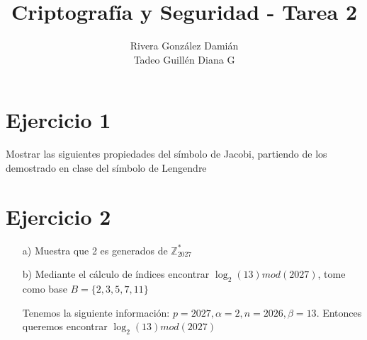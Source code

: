 \documentclass[12pt, letterpaper]{article}
\title{Criptografía y Seguridad - Tarea 2}
\author{Rivera González Damián\\Tadeo Guillén Diana G}
\begin{document}
\maketitle
\section*{Ejercicio 1}
Mostrar las siguientes propiedades del símbolo de Jacobi, partiendo de los demostrado en clase del símbolo de Lengendre

\section*{Ejercicio 2}
\begin{itemize}
\item[a)] Muestra que 2 es generados de $\mathbb{Z}^*_{2027}$
\item[b)] Mediante el cálculo de índices encontrar $\log_2{(13)}mod(2027)$, tome como base $B = \{2,3,5,7,11\}$

Tenemos la siguiente información: $p = 2027, \alpha = 2, n = 2026, \beta = 13$. Entonces queremos encontrar $\log_2{(13)} mod (2027)$


\end{itemize}
\end{document}
